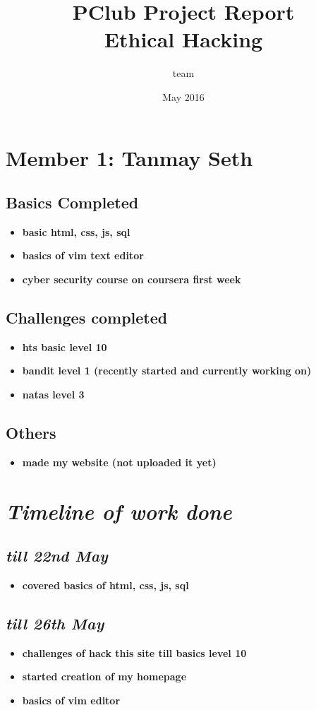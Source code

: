\documentclass{article}
\title{
PClub Project Report
\\
Ethical Hacking
}
\author{team}
\date{May 2016}
\begin{document}
\maketitle

\newpage
\section*{Member 1: Tanmay Seth}
\subsection*{Basics Completed}
\begin{itemize}
    \item \textbf{ basic html, css, js, sql}
    \item \textbf{basics of vim text editor}
    \item \textbf{cyber security course on coursera first week}
\end{itemize}
\subsection*{Challenges completed}
\begin{itemize}
    \item \textbf{hts basic level 10}
    \item \textbf{bandit level 1 (recently started and currently working on)}
    \item \textbf{natas level 3}
\end{itemize}
\subsection*{Others}
\begin{itemize}
    \item \textbf{made my website (not uploaded it yet)}
\end{itemize}
\section*{\textit{Timeline of work done}}
\subsection*{\textit{till 22nd May}}
\begin{itemize}
    \item \textbf{covered basics of html, css, js, sql}
\end{itemize}
\subsection*{\textit{till 26th May}}
\begin{itemize}
    \item \textbf{challenges of hack this site till basics level 10}
    \item 
\textbf{started creation of my homepage}
    \item \textbf{basics of vim editor}
\end{itemize}
\end{document}
